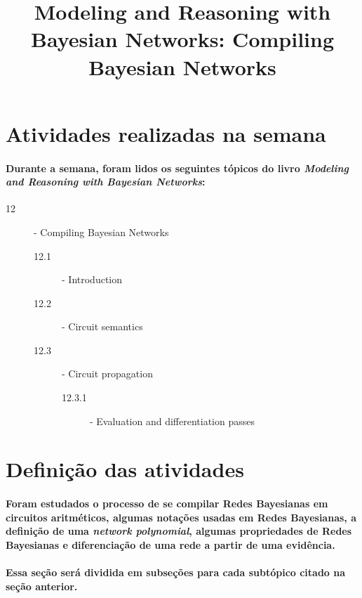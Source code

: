 \documentclass[a4paper,10pt]{article}
\title{\textbf{Modeling and Reasoning with Bayesian Networks: Compiling Bayesian Networks}}
\theoremstyle{plain}
\begin{document}
\date{}
\author{}
\vspace*{-40pt}
{\let\newpage\relax\maketitle}

\newpage

\section{Atividades realizadas na semana}

\paragraph{
  Durante a semana, foram lidos os seguintes tópicos do livro \textit{Modeling and Reasoning with
Bayesian Networks}\cite{bayes-net-darwiche}:
}

\begin{description}
  \item[12] - Compiling Bayesian Networks
  \begin{description}
    \item[12.1] - Introduction
    \item[12.2] - Circuit semantics
    \item[12.3] - Circuit propagation
    \begin{description}
      \item[12.3.1] - Evaluation and differentiation passes
    \end{description}
  \end{description}
\end{description}

\section{Definição das atividades}

\paragraph{
  Foram estudados o processo de se compilar Redes Bayesianas em circuitos aritméticos, algumas 
notações usadas em Redes Bayesianas, a definição de uma \textit{network polynomial}, algumas 
propriedades de Redes Bayesianas e diferenciação de uma rede a partir de uma evidência.
}

\paragraph{
  Essa seção será dividida em subseções para cada subtópico citado na seção anterior.
}
\end{document}
